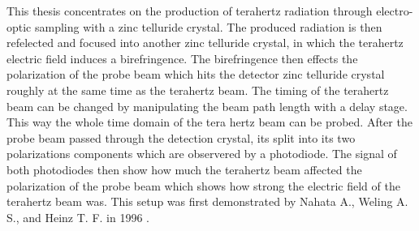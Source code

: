 This thesis concentrates on the production of terahertz radiation through electro-optic sampling with a zinc telluride crystal.
The produced radiation is then refelected and focused into another zinc telluride crystal, in which the terahertz electric field induces a birefringence.
The birefringence then effects the polarization of the probe beam which hits the detector zinc telluride crystal roughly at the same time as the terahertz beam.
The timing of the terahertz beam can be changed by manipulating the beam path length with a delay stage.
This way the whole time domain of the tera hertz beam can be probed.
After the probe beam passed through the detection crystal, its split into its two polarizations components which are observered by a photodiode.
The signal of both photodiodes then show how much the terahertz beam affected the polarization of the probe beam which shows how strong the electric field of the terahertz beam was.
This setup was first demonstrated by Nahata A., Weling A. S., and Heinz T. F. in 1996 \cite{ZnTe_Nahata_Weling_1996}.





